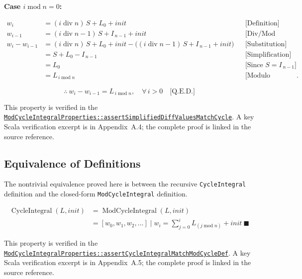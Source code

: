 \textbf{Case $i \operatorname{mod} n = 0$:}

\begin{equation*}
\begin{aligned}
w_i &= (i \operatorname{div} n)\,S + L_0 + init
&&\text{[Definition]} \\
w_{i-1} &= (i \operatorname{div} n -1)\,S + I_{\,n-1} + init
&&\text{[Div/Mod property]} \\
w_i-w_{i-1}
    &= (i \operatorname{div} n)\,S + L_0 + init
       - \big((i \operatorname{div} n -1)\,S + I_{\,n-1} + init\big)
&&\text{[Substitution]} \\
    &= S + L_0 - I_{\,n-1}
&&\text{[Simplification]} \\
    &= L_0
&&\text{[Since } S = I_{\,n-1}] \\
    &= L_{\,i \operatorname{mod} n}
&&\text{[Modulo property]}.
\end{aligned}
\end{equation*}

\begin{equation*}
\therefore \
w_i - w_{i-1} = L_{\, i \operatorname{mod} n}, \quad \forall\, i > 0 \quad \text{[Q.E.D.]}
\end{equation*}

{\raggedright
This property is verified in the
\href{https://github.com/thiagomata/prime-numbers/blob/integral-cycle-article-v1.0.0/src/main/scala/v1/chapter4/cycle/integral/mod/ModCycleIntegralProperties.scala}{\texttt{ModCycleIntegralProperties::\allowbreak assertSimplifiedDiffValuesMatchCycle}}.
A key Scala verification excerpt is in Appendix~A.4; the complete proof is
linked in the source reference.\par}

\subsection{Equivalence of Definitions}

The nontrivial equivalence proved here is between the recursive
\texttt{CycleIntegral} definition and the closed-form
\texttt{ModCycleIntegral} definition.

\begin{equation*}
\begin{aligned}
\operatorname{CycleIntegral}(L, init)
&= \operatorname{ModCycleIntegral}(L, init) \\
&= [w_0, w_1, w_2, \ldots] \mid w_i = \sum_{j=0}^i L_{(j \operatorname{mod} n)} + init \ \blacksquare
\end{aligned}
\end{equation*}

{\raggedright
This property is verified in the
\href{https://github.com/thiagomata/prime-numbers/blob/integral-cycle-article-v1.0.0/src/main/scala/v1/chapter4/cycle/integral/mod/ModCycleIntegralProperties.scala}{\texttt{ModCycleIntegralProperties::\allowbreak assertCycleIntegralMatchModCycleDef}}.
A key Scala verification excerpt is in Appendix~A.5; the complete proof is
linked in the source reference.\par}

